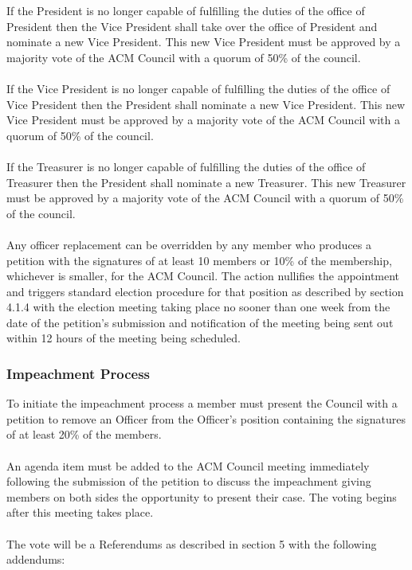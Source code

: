 \documentclass[12pt,titlepage]{article}
\begin{document}
If the President is no longer capable of fulfilling the duties of the office of President then the Vice President shall take over the office of President and nominate a new Vice President. This new Vice President must be approved by a majority vote of the ACM Council with a quorum of 50\% of the council.\\
\\
If the Vice President is no longer capable of fulfilling the duties of the office of Vice President then the President shall nominate a new Vice President. This new Vice President must be approved by a majority vote of the ACM Council with a quorum of 50\% of the council.\\
\\
If the Treasurer is no longer capable of fulfilling the duties of the office of Treasurer then the President shall nominate a new Treasurer. This new Treasurer must be approved by a majority vote of the ACM Council with a quorum of 50\% of the council.\\
\\
Any officer replacement can be overridden by any member who produces a petition with the signatures of at least 10 members or 10\% of the membership, whichever is smaller, for the ACM Council. The action nullifies the appointment and triggers standard election procedure for that position as described by section 4.1.4 with the election meeting taking place no sooner than one week from the date of the petition's submission and notification of the meeting being sent out within 12 hours of the meeting being scheduled.

\subsubsection{Impeachment Process}

To initiate the impeachment process a member must present the Council with a petition to remove an Officer from the Officer's position containing the signatures of at least 20\% of the members.\\
\\
An agenda item must be added to the ACM Council meeting immediately following the submission of the petition to discuss the impeachment giving members on both sides the opportunity to present their case. The voting begins after this meeting takes place.\\
\\
The vote will be a Referendums as described in section 5 with the following addendums:
\end{document}
